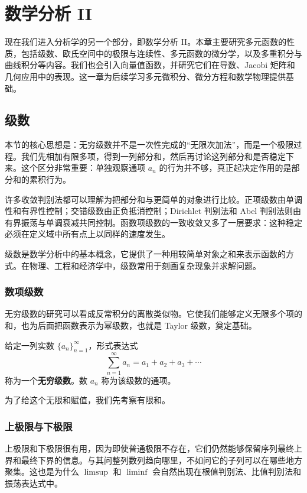 \chapter{数学分析 II}

现在我们进入分析学的另一个部分，即数学分析 II。本章主要研究多元函数的性质，包括级数、欧氏空间中的极限与连续性、多元函数的微分学，以及多重积分与曲线积分等内容。我们也会引入向量值函数，并研究它们在导数、Jacobi 矩阵和几何应用中的表现。这一章为后续学习多元微积分、微分方程和数学物理提供基础。

\section{级数}

本节的核心思想是：无穷级数并不是一次性完成的“无限次加法”，而是一个极限过程。我们先相加有限多项，得到一列部分和，然后再讨论这列部分和是否稳定下来。这个区分非常重要：单独观察通项 $a_n$ 的行为并不够，真正起决定作用的是部分和的累积行为。

许多收敛判别法都可以理解为把部分和与更简单的对象进行比较。正项级数由单调性和有界性控制；交错级数由正负抵消控制；Dirichlet 判别法和 Abel 判别法则由有界振荡与单调衰减共同控制。函数项级数的一致收敛又多了一层要求：这种稳定必须在定义域中所有点上以同样的速度发生。

级数是数学分析中的基本概念，它提供了一种用较简单对象之和来表示函数的方式。在物理、工程和经济学中，级数常用于刻画复杂现象并求解问题。

\subsection{数项级数}

无穷级数的研究可以看成反常积分的离散类似物。它使我们能够定义无限多个项的和，也为后面把函数表示为幂级数，也就是 Taylor 级数，奠定基础。

\begin{definition}[无穷级数]
给定一列实数 $\{a_n\}_{n=1}^{\infty}$，形式表达式
\[
    \sum_{n=1}^{\infty}a_n=a_1+a_2+a_3+\cdots
\]
称为一个\textbf{无穷级数}。数 $a_n$ 称为该级数的通项。
\end{definition}

为了给这个无限和赋值，我们先考察有限和。

\subsection{上极限与下极限}

上极限和下极限很有用，因为即使普通极限不存在，它们仍然能够保留序列最终上界和最终下界的信息。与其问整列数列趋向哪里，不如问它的子列可以在哪些地方聚集。这也是为什么 $\limsup$ 和 $\liminf$ 会自然出现在根值判别法、比值判别法和振荡表达式中。

